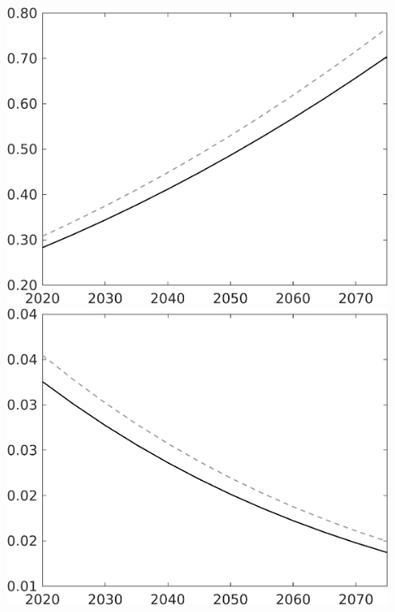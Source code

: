 \documentclass[12pt]{article}
\begin{document}
\begin{figure}[h!!]
\begin{minipage}[]{0.32\textwidth}
	\end{minipage}	
	\begin{minipage}[]{0.32\textwidth}
		\includegraphics[width=1\textwidth]{../../codding_model/own_basedOnFried/optimalPol_010922_revision/figures/all_13Sept22/CompTaul_LFBAU_Reg0_F_spillover0_nsk1_xgr0_knspil1_sep1_countec0_GovRev0_etaa0.79_lgd0.png}
	\end{minipage}	
	\begin{minipage}[]{0.32\textwidth}
		\includegraphics[width=1\textwidth]{../../codding_model/own_basedOnFried/optimalPol_010922_revision/figures/all_13Sept22/CompTaul_LFBAU_Reg0_G_spillover0_nsk1_xgr0_knspil1_sep1_countec0_GovRev0_etaa0.79_lgd0.png}

\end{minipage}
\end{figure}
\end{document}
